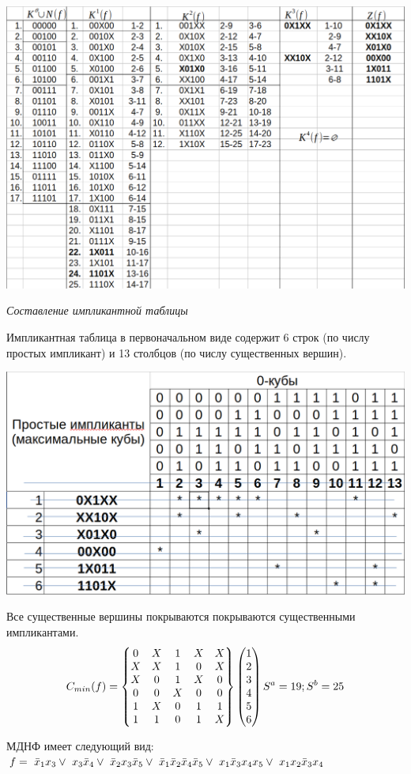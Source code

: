\begin{center}
\includegraphics[width=\linewidth]{imgs/kvain_mak_table.png}
\end{center}
\par\textit{Составление импликантной таблицы}

Импликантная таблица в первоначальном виде содержит 6 строк (по числу 
простых импликант) и 13 столбцов (по числу существенных вершин).

\begin{center}
\includegraphics[width=0.6\linewidth]{imgs/implicant_table.png}
\end{center}

Все существенные вершины покрываются покрываются существенными импликантами.
\begin{equation*}
  C_{min}(f)= 
  \begin{Bmatrix}
    0 & X & 1 & X & X \\
    X & X & 1 & 0 & X \\
    X & 0 & 1 & X & 0 \\ 
    0 & 0 & X & 0 & 0 \\ 
    1 & X & 0 & 1 & 1 \\ 
    1 & 1 & 0 & 1 & X 
  \end{Bmatrix}
  \begin{pmatrix}
    1 \\ 2 \\ 3 \\ 4 \\ 5 \\ 6
  \end{pmatrix}
  S^a = 19; \hfill S^b = 25
\end{equation*}

МДНФ имеет следующий вид: \\
$ f = \
\bar{x}_{1}x_{3} \vee \
x_{3}\bar{x}_{4} \vee \
\bar{x}_{2}x_{3}\bar{x}_{5} \vee \
\bar{x}_{1}\bar{x}_{2}\bar{x}_{4}\bar{x}_{5} \vee \
x_{1}\bar{x}_{3}x_{4}x_{5}  \vee \
x_{1}x_{2}\bar{x}_{3}x_{4} \
$